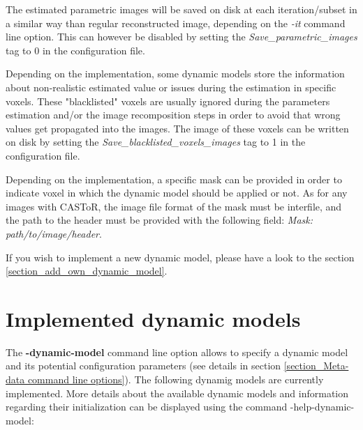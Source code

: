 \documentclass[a4paper, 11pt]{article}
\begin{document}
The estimated parametric images will be saved on disk at each iteration/subset in a similar way than regular reconstructed image, depending on the \textit{-it} command line option. This can however be disabled by setting the \textit{Save\_parametric\_images} tag to 0 in the configuration file.

Depending on the implementation, some dynamic models store the information about non-realistic estimated value or issues during the estimation in specific voxels. These "blacklisted" voxels are usually ignored during the parameters estimation and/or the image recomposition steps in order to avoid that wrong values get propagated into the images. The image of these voxels can be written on disk by setting the \textit{Save\_blacklisted\_voxels\_images} tag to 1 in the configuration file.

Depending on the implementation, a specific mask can be provided in order to indicate voxel in which the dynamic model should be applied or not. As for any images with CASToR, the image file format of the mask must be interfile, and the path to the header must be provided with the following field: \textit{Mask: path/to/image/header}.

If you wish to implement a new dynamic model, please have a look to the section \ref{section_add_own_dynamic_model}.





\clearpage
\section{Implemented dynamic models}
\label{s_implementedModels}

The \textbf{-dynamic-model} command line option allows to specify a dynamic model and its potential configuration parameters (see details in section \ref{section_Meta-data command line options}). The following dynamig models are currently implemented. More details about the available dynamic models and information regarding their initialization can be displayed using the command -help-dynamic-model: 
\end{document}
